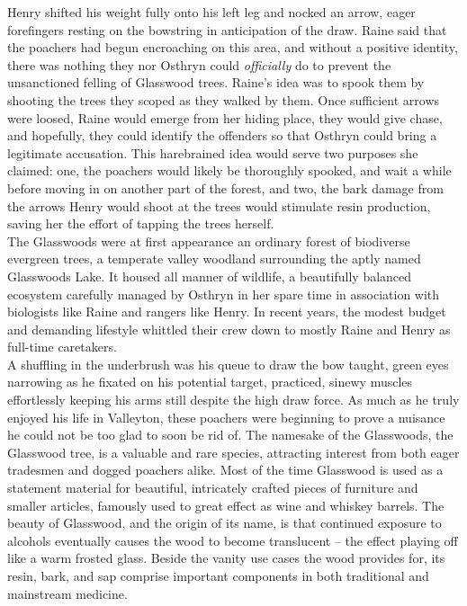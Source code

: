 Henry shifted his weight fully onto his left leg and nocked an arrow, eager forefingers resting on the bowstring in anticipation of the draw.
Raine said that the poachers had begun encroaching on this area, and without a positive identity, there was nothing they nor Osthryn could \textit{officially} do to prevent the unsanctioned felling of Glasswood trees.
Raine's idea was to spook them by shooting the trees they scoped as they walked by them. 
Once sufficient arrows were loosed, Raine would emerge from her hiding place, they would give chase, and hopefully, they could identify the offenders so that Osthryn could bring a legitimate accusation. 
This harebrained idea would serve two purposes she claimed: one, the poachers would likely be thoroughly spooked, and wait a while before moving in on another part of the forest, and two, the bark damage from the arrows Henry would shoot at the trees would stimulate resin production, saving her the effort of tapping the trees herself.\\

The Glasswoods were at first appearance an ordinary forest of biodiverse evergreen trees, a temperate valley woodland surrounding the aptly named Glasswoods Lake.
It housed all manner of wildlife, a beautifully balanced ecosystem carefully managed by Osthryn in her spare time in association with biologists like Raine and rangers like Henry. 
In recent years, the modest budget and demanding lifestyle whittled their crew down to mostly Raine and Henry as full-time caretakers.\\

A shuffling in the underbrush was his queue to draw the bow taught, green eyes narrowing as he fixated on his potential target, practiced, sinewy muscles effortlessly keeping his arms still despite the high draw force.
As much as he truly enjoyed his life in Valleyton, these poachers were beginning to prove a nuisance he could not be too glad to soon be rid of.
The namesake of the Glasswoods, the Glasswood tree, is a valuable and rare species, attracting interest from both eager tradesmen and dogged poachers alike.
Most of the time Glasswood is used as a statement material for beautiful, intricately crafted pieces of furniture and smaller articles, famously used to great effect as wine and whiskey barrels.
The beauty of Glasswood, and the origin of its name, is that continued exposure to alcohols eventually causes the wood to become translucent -- the effect playing off like a warm frosted glass.
Beside the vanity use cases the wood provides for, its resin, bark, and sap comprise important components in both traditional and mainstream medicine.\\

